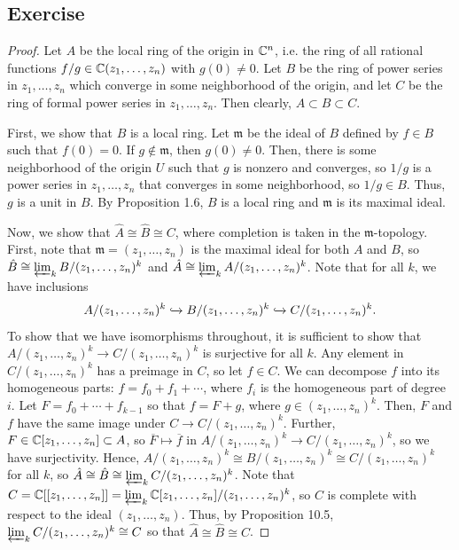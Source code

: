 \subsection{Exercise}\label{10.8}

\begin{proof}
Let $A$ be the local ring of the origin in $\mathbb{C}^n$, i.e. the ring of all rational functions $f/g \in \mathbb{C}(z_1,\ldots,z_n)$
with $g(0) \neq 0$. Let $B$ be the ring of power series in $z_1,\ldots,z_n$ which converge in some neighborhood of the
origin, and let $C$ be the ring of formal power series in $z_1,\ldots,z_n$. Then clearly, $A \subset B \subset C$.

First, we show that $B$ is a local ring. Let $\mathfrak{m}$ be the ideal of $B$ defined by $f \in B$ such that $f(0) = 0$.
If $g \not\in \mathfrak{m}$, then $g(0) \neq 0$. Then, there is some neighborhood of the origin $U$ such that $g$ is nonzero 
and converges, so $1/g$ is a power series in $z_1,\ldots,z_n$ that converges in some neighborhood, so $1/g \in B$. Thus, $g$ 
is a unit in $B$. By Proposition 1.6, $B$ is a local ring and $\mathfrak{m}$ is its maximal ideal.

Now, we show that $\hat A \cong \hat B \cong C$, where completion is taken in the $\mathfrak{m}$-topology. First, note that 
$\mathfrak{m} = (z_1,\ldots,z_n)$ is the maximal ideal for both $A$ and $B$, so $\hat B \cong \varprojlim_k B/(z_1,\ldots,z_n)^k$ and
$\hat A \cong \varprojlim_k A/(z_1,\ldots,z_n)^k$. Note that for all $k$, we have inclusions 
$$A/(z_1,\ldots,z_n)^k \xhookrightarrow{} B/(z_1,\ldots,z_n)^k \xhookrightarrow{} C/(z_1,\ldots,z_n)^k.$$
To show that we have isomorphisms throughout, it is sufficient to show that $A/(z_1,\ldots,z_n)^k \to C/(z_1,\ldots,z_n)^k$ is surjective
for all $k$. Any element in $C/(z_1,\ldots,z_n)^k$ has a preimage in $C$, so let $f \in C$. 
We can decompose $f$ into its homogeneous parts: $f = f_0 + f_1 + \cdots$, where $f_i$ is the homogeneous part of 
degree $i$. Let $F = f_0 + \cdots + f_{k-1}$ so that $f = F + g$, where $g \in (z_1,\ldots,z_n)^k$. Then, $F$ and $f$ 
have the same image under $C \to C/(z_1,\ldots,z_n)^k$. Further, $F \in \mathbb{C}[z_1,\ldots,z_n] \subset A$, so $\overline{F} \mapsto \overline{f}$
in $A/(z_1,\ldots,z_n)^k \to C/(z_1,\ldots,z_n)^k$, so we have surjectivity. Hence, 
$A/(z_1,\ldots,z_n)^k \cong B/(z_1,\ldots,z_n)^k \cong C/(z_1,\ldots,z_n)^k$ for all $k$, so 
$\hat A \cong \hat B \cong \varprojlim_k C/(z_1,\ldots,z_n)^k$. Note that 
$C = \mathbb{C}[[z_1,\ldots,z_n]] = \varprojlim_k \mathbb{C}[z_1,\ldots,z_n]/(z_1,\ldots,z_n)^k$, so $C$ is complete with respect to the ideal
$(z_1,\ldots,z_n)$. Thus, by Proposition 10.5, $\varprojlim_k C/(z_1,\ldots,z_n)^k \cong C$ so that $\hat A \cong \hat B \cong C$.


\end{proof}
